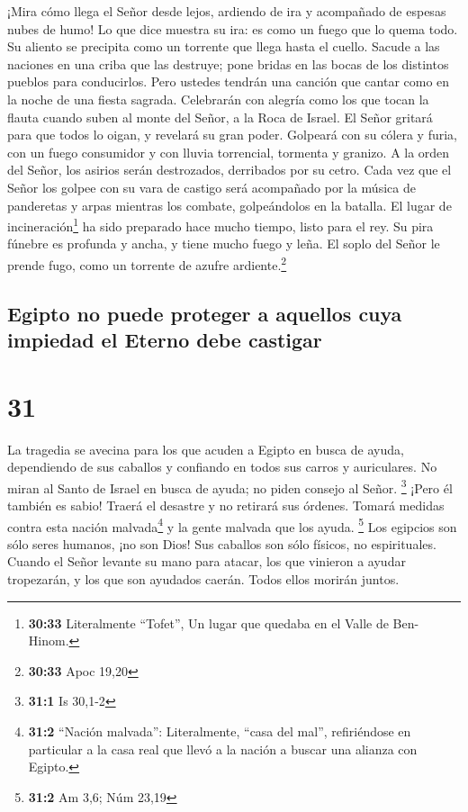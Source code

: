  ¡Mira cómo llega el Señor desde lejos, ardiendo de ira y
acompañado de espesas nubes de humo! Lo que dice muestra su ira: es como
un fuego que lo quema todo.  Su aliento se precipita como
un torrente que llega hasta el cuello. Sacude a las naciones en una
criba que las destruye; pone bridas en las bocas de los distintos
pueblos para conducirlos.  Pero ustedes tendrán una
canción que cantar como en la noche de una fiesta sagrada. Celebrarán
con alegría como los que tocan la flauta cuando suben al monte del
Señor, a la Roca de Israel.  El Señor gritará para que
todos lo oigan, y revelará su gran poder. Golpeará con su cólera y
furia, con un fuego consumidor y con lluvia torrencial, tormenta y
granizo.  A la orden del Señor, los asirios serán
destrozados, derribados por su cetro.  Cada vez que el
Señor los golpee con su vara de castigo será acompañado por la música de
panderetas y arpas mientras los combate, golpeándolos en la batalla.
 El lugar de incineración\footnote{\textbf{30:33}
  Literalmente ``Tofet'', Un lugar que quedaba en el Valle de Ben-Hinom.}
ha sido preparado hace mucho tiempo, listo para el rey. Su pira fúnebre
es profunda y ancha, y tiene mucho fuego y leña. El soplo del Señor le
prende fugo, como un torrente de azufre ardiente.\footnote{\textbf{30:33}
  Apoc 19,20}

\hypertarget{egipto-no-puede-proteger-a-aquellos-cuya-impiedad-el-eterno-debe-castigar}{%
\subsection{Egipto no puede proteger a aquellos cuya impiedad el Eterno
debe
castigar}\label{egipto-no-puede-proteger-a-aquellos-cuya-impiedad-el-eterno-debe-castigar}}

\hypertarget{section-30}{%
\section{31}\label{section-30}}

 La tragedia se avecina para los que acuden a Egipto en
busca de ayuda, dependiendo de sus caballos y confiando en todos sus
carros y auriculares. No miran al Santo de Israel en busca de ayuda; no
piden consejo al Señor. \footnote{\textbf{31:1} Is 30,1-2}
 ¡Pero él también es sabio! Traerá el desastre y no
retirará sus órdenes. Tomará medidas contra esta nación
malvada\footnote{\textbf{31:2} ``Nación malvada'': Literalmente, ``casa
  del mal'', refiriéndose en particular a la casa real que llevó a la
  nación a buscar una alianza con Egipto.} y la gente malvada que los
ayuda. \footnote{\textbf{31:2} Am 3,6; Núm 23,19}  Los
egipcios son sólo seres humanos, ¡no son Dios! Sus caballos son sólo
físicos, no espirituales. Cuando el Señor levante su mano para atacar,
los que vinieron a ayudar tropezarán, y los que son ayudados caerán.
Todos ellos morirán juntos.

